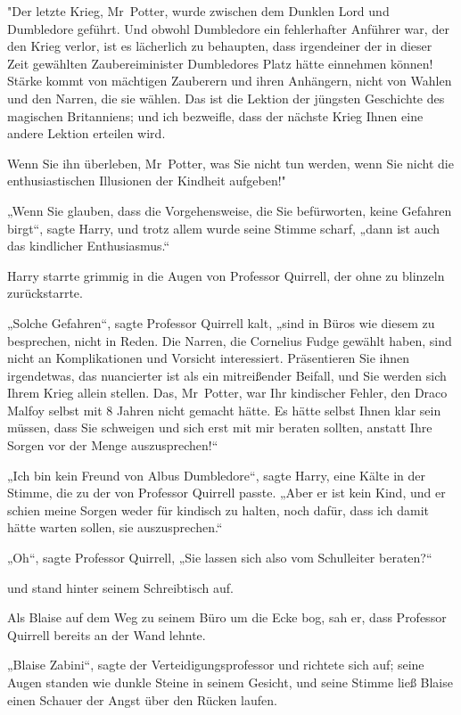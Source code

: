 {"Der letzte Krieg, Mr~Potter, wurde zwischen dem Dunklen Lord und Dumbledore geführt. Und obwohl Dumbledore ein fehlerhafter Anführer war, der den Krieg verlor, ist es lächerlich zu behaupten, dass irgendeiner der in dieser Zeit gewählten Zaubereiminister Dumbledores Platz hätte einnehmen können! Stärke kommt von mächtigen Zauberern und ihren Anhängern, nicht von Wahlen und den Narren, die sie wählen. Das ist die Lektion der jüngsten Geschichte des magischen Britanniens; und ich bezweifle, dass der nächste Krieg Ihnen eine andere Lektion erteilen wird.

Wenn Sie ihn überleben, Mr~Potter, was Sie nicht tun werden, wenn Sie nicht die enthusiastischen Illusionen der Kindheit aufgeben!"

„Wenn Sie glauben, dass die Vorgehensweise, die Sie befürworten, keine Gefahren birgt“, sagte Harry, und trotz allem wurde seine Stimme scharf, „dann ist auch das kindlicher Enthusiasmus.“

Harry starrte grimmig in die Augen von Professor Quirrell, der ohne zu blinzeln zurückstarrte.

„Solche Gefahren“, sagte Professor Quirrell kalt, „sind in Büros wie diesem zu besprechen, nicht in Reden. Die Narren, die Cornelius Fudge gewählt haben, sind nicht an Komplikationen und Vorsicht interessiert. Präsentieren Sie ihnen irgendetwas, das nuancierter ist als ein mitreißender Beifall, und Sie werden sich Ihrem Krieg allein stellen. Das, Mr~Potter, war Ihr kindischer Fehler, den Draco Malfoy selbst mit 8 Jahren nicht gemacht hätte. Es hätte selbst Ihnen klar sein müssen, dass Sie schweigen und sich erst mit mir beraten sollten, anstatt Ihre Sorgen vor der Menge auszusprechen!“

„Ich bin kein Freund von Albus Dumbledore“, sagte Harry, eine Kälte in der Stimme, die zu der von Professor Quirrell passte. „Aber er ist kein Kind, und er schien meine Sorgen weder für kindisch zu halten, noch dafür, dass ich damit hätte warten sollen, sie auszusprechen.“

„Oh“, sagte Professor Quirrell, „Sie lassen sich also vom Schulleiter beraten?“

und stand hinter seinem Schreibtisch auf.

Als Blaise auf dem Weg zu seinem Büro um die Ecke bog, sah er, dass Professor Quirrell bereits an der Wand lehnte.

„Blaise Zabini“, sagte der Verteidigungsprofessor und richtete sich auf; seine Augen standen wie dunkle Steine in seinem Gesicht, und seine Stimme ließ Blaise einen Schauer der Angst über den Rücken laufen.

}
